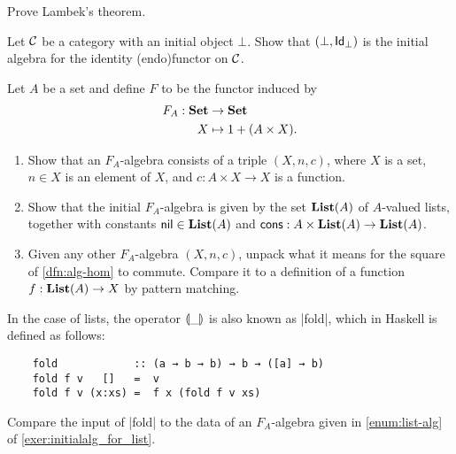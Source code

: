 \begin{exer} 
  Prove Lambek's theorem. 
\end{exer}

\begin{exer}\label{exer:initialalg_for_idfun_with_initialob} Let $\CC$ be a category with an initial object $\bot$. Show that $(\bot, \Id[\bot])$ is the initial algebra for the identity (endo)functor on $\CC$.
\end{exer}

\begin{exer}\label{exer:initialalg_for_list}
  Let $A$ be a set and define $F$ to be the functor induced by 
\begin{align*}
  F_A:\SET &\to\SET
\\
  X &\mapsto 1 + (A\times X).
\end{align*}

\begin{enumerate}
\item \label{enum:list-alg} Show that an $F_A$-algebra consists of a triple $(X,n,c)$, where $X$ is a set, $n\in X$ is an element of $X$, and $c : A \times X \to X$ is a function.
\item Show that the initial $F_A$-algebra is given by the set $\List(A)$ of $A$-valued lists, together with constants $\nil \in \List(A)$ and $\cons : A \times \List(A) \to \List(A)$.
\item Given any other $F_A$-algebra $(X,n,c)$, unpack what it means for the square of \cref{dfn:alg-hom} to commute.
Compare it to a definition of a function $f : \List(A) \to X$ by pattern matching.
\end{enumerate}

\end{exer}

\begin{rem}
  In the case of lists, the operator $\catam{\_}$ is also known as |fold|, which in Haskell is defined as follows:
  \begin{lstlisting}
    fold            :: (a → b → b) → b → ([a] → b)
    fold f v   []   =  v
    fold f v (x:xs) =  f x (fold f v xs)
  \end{lstlisting}
  Compare the input of |fold| to the data of an $F_A$-algebra given in \cref{enum:list-alg} of \cref{exer:initialalg_for_list}.
\end{rem}


